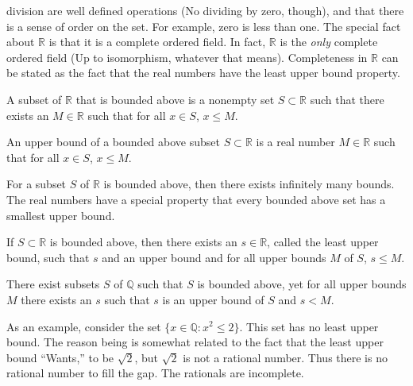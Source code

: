\documentclass[crop=false,class=article,oneside]{standalone}
\begin{document}
            division are well defined operations (No dividing by
            zero, though), and that there is a sense of order on
            the set. For example, zero is less than one. The
            special fact about $\mathbb{R}$ is that it is a
            complete ordered field. In fact, $\mathbb{R}$ is the
            \textit{only} complete ordered field (Up to isomorphism,
            whatever that means). Completeness in $\mathbb{R}$ can
            be stated as the fact that the real numbers have the
            least upper bound property.
            \begin{definition}
                A subset of $\mathbb{R}$ that is bounded above is
                a nonempty set $S\subset{\mathbb{R}}$ such that
                there exists an $M\in\mathbb{R}$ such that for all
                $x\in{S}$, $x\leq{M}$.
            \end{definition}
            \begin{definition}
                An upper bound of a bounded above subset
                $S\subset\mathbb{R}$ is a real number $M\in\mathbb{R}$
                such that for all $x\in{S}$, $x\leq{M}$.
            \end{definition}
            For a subset $S$ of $\mathbb{R}$ is bounded above, then
            there exists infinitely many bounds. The real numbers
            have a special property that every bounded above set
            has a smallest upper bound.
            \begin{theorem}
                If $S\subset{\mathbb{R}}$ is bounded above, then
                there exists an $s\in\mathbb{R}$, called the least
                upper bound, such that $s$ and an upper bound
                and for all upper bounds $M$ of $S$, $s\leq{M}$.
            \end{theorem}
            \begin{theorem}
                There exist subsets $S$ of $\mathbb{Q}$ such that
                $S$ is bounded above, yet for all upper bounds
                $M$ there exists an $s$ such that $s$ is an upper
                bound of $S$ and $s<M$.
            \end{theorem}
            \begin{example}
                As an example, consider the set
                $\{x\in\mathbb{Q}:x^{2}\leq{2}\}$.
                This set has no least upper bound. The reason
                being is somewhat related to the fact that the
                least upper bound ``Wants,'' to be $\sqrt{2}$,
                but $\sqrt{2}$ is not a rational number. Thus
                there is no rational number to fill the gap.
                The rationals are incomplete.
            \end{example}
\end{document}
